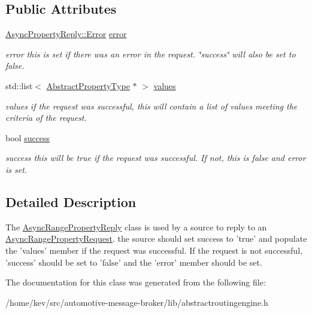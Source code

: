 \subsection*{Public Attributes}
\begin{DoxyCompactItemize}
\item 
\hypertarget{classAsyncRangePropertyReply_a43762c9a2d88ec91e3218f7eca297e56}{\hyperlink{classAsyncPropertyReply_ad91affaa25fcc3b73947a6cf4591e5d1}{Async\-Property\-Reply\-::\-Error} \hyperlink{classAsyncRangePropertyReply_a43762c9a2d88ec91e3218f7eca297e56}{error}}\label{classAsyncRangePropertyReply_a43762c9a2d88ec91e3218f7eca297e56}

\begin{DoxyCompactList}\small\item\em error this is set if there was an error in the request. \char`\"{}success\char`\"{} will also be set to false. \end{DoxyCompactList}\item 
\hypertarget{classAsyncRangePropertyReply_a4ce96fd40ce8ec3fddab46652026734b}{std\-::list$<$ \hyperlink{classAbstractPropertyType}{Abstract\-Property\-Type} $\ast$ $>$ \hyperlink{classAsyncRangePropertyReply_a4ce96fd40ce8ec3fddab46652026734b}{values}}\label{classAsyncRangePropertyReply_a4ce96fd40ce8ec3fddab46652026734b}

\begin{DoxyCompactList}\small\item\em values if the request was successful, this will contain a list of values meeting the criteria of the request. \end{DoxyCompactList}\item 
\hypertarget{classAsyncRangePropertyReply_a4eab37dada60970211e62b0fc3aeac92}{bool \hyperlink{classAsyncRangePropertyReply_a4eab37dada60970211e62b0fc3aeac92}{success}}\label{classAsyncRangePropertyReply_a4eab37dada60970211e62b0fc3aeac92}

\begin{DoxyCompactList}\small\item\em success this will be true if the request was successful. If not, this is false and error is set. \end{DoxyCompactList}\end{DoxyCompactItemize}


\subsection{Detailed Description}
The \hyperlink{classAsyncRangePropertyReply}{Async\-Range\-Property\-Reply} class is used by a source to reply to an \hyperlink{classAsyncRangePropertyRequest}{Async\-Range\-Property\-Request}. the source should set success to 'true' and populate the 'values' member if the request was successful. If the request is not successful, 'success' should be set to 'false' and the 'error' member should be set. 

The documentation for this class was generated from the following file\-:\begin{DoxyCompactItemize}
\item 
/home/kev/src/automotive-\/message-\/broker/lib/abstractroutingengine.\-h\end{DoxyCompactItemize}
